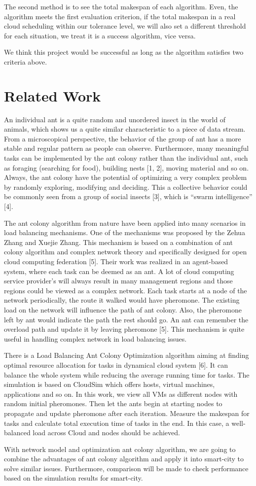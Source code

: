 \documentclass[conference]{IEEEtran}
\begin{document}
The second method is to see the total makespan of each algorithm. Even, the algorithm meets the first evaluation criterion, if the total makespan in a real cloud scheduling within our tolerance level, we will also set a different threshold for each situation, we treat it is a success algorithm, vice versa.

We think this project would be successful as long as the algorithm  satisfies two criteria above.

\section{Related Work}

An individual ant is a quite random and unordered insect in the world of animals, which shows us a quite similar characteristic to a piece of data stream. From a microscopical perspective, the behavior of the group of ant has a more stable and regular pattern as people can observe. Furthermore, many meaningful tasks can be implemented by the ant colony rather than the individual ant, such as foraging (searching for food), building nests [1, 2], moving material and so on. Always, the ant colony have the potential of optimizing a very complex problem by randomly exploring, modifying and deciding. This a collective behavior could be commonly seen from a group of social insects [3], which is “swarm intelligence” [4]. 

The ant colony algorithm from nature have been applied into many scenarios in load balancing mechanisms. One of the mechanisms was proposed by the Zehua Zhang and Xuejie Zhang. This mechanism is based on a combination of ant colony algorithm and complex network theory and specifically designed for open cloud computing federation [5]. Their work was realized in an agent-based system, where each task can be deemed as an ant. A lot of cloud computing service provider’s will always result in many management regions and those regions could be viewed as a complex network. Each task starts at a node of the network periodically, the route it walked would have pheromone. The existing load on the network will influence the path of ant colony. Also, the pheromone left by ant would indicate the path the rest should go. An ant can remember the overload path and update it by leaving pheromone [5]. This mechanism is quite useful in handling complex network in load balancing issues.

There is a Load Balancing Ant Colony Optimization algorithm aiming at finding optimal resource allocation for tasks in dynamical cloud system [6]. It can balance the whole system while reducing the average running time for tasks. The simulation is based on CloudSim which offers hosts, virtual machines, applications and so on. In this work, we view all VMs as different nodes with random initial pheromones. Then let the ants begin at starting nodes to propagate and update pheromone after each iteration. Measure the makespan for tasks and calculate total execution time of tasks in the end. In this case, a well-balanced load across Cloud and nodes should be achieved.

With network model and optimization ant colony algorithm, we are going to combine the advantages of ant colony algorithm and apply it into smart-city to solve similar issues. Furthermore, comparison will be made to check performance based on the simulation results for smart-city.
\end{document}
